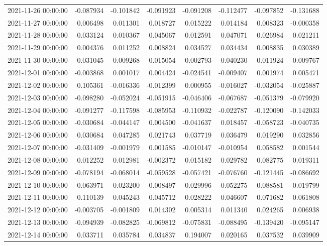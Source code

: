 \begin{tabular}{lrrrrrrr}
2021-11-26 00:00:00 & -0.087934 & -0.101842 & -0.091923 & -0.091208 & -0.112477 & -0.097852 & -0.131688 \\
2021-11-27 00:00:00 & 0.006498 & 0.011301 & 0.018727 & 0.015222 & 0.014184 & 0.008323 & -0.000358 \\
2021-11-28 00:00:00 & 0.033124 & 0.010367 & 0.045067 & 0.012591 & 0.047071 & 0.026984 & 0.021211 \\
2021-11-29 00:00:00 & 0.004376 & 0.011252 & 0.008824 & 0.034527 & 0.034434 & 0.008835 & 0.030389 \\
2021-11-30 00:00:00 & -0.031045 & -0.009268 & -0.015054 & -0.002793 & 0.040230 & 0.011924 & 0.009767 \\
2021-12-01 00:00:00 & -0.003868 & 0.001017 & 0.004424 & -0.024541 & -0.009407 & 0.001974 & 0.005471 \\
2021-12-02 00:00:00 & 0.105361 & -0.016336 & -0.012399 & 0.000955 & -0.016027 & -0.032054 & -0.025887 \\
2021-12-03 00:00:00 & -0.098280 & -0.052024 & -0.051915 & -0.046406 & -0.067687 & -0.051379 & -0.079920 \\
2021-12-04 00:00:00 & -0.091277 & -0.117598 & -0.085953 & -0.110932 & -0.022787 & -0.120090 & -0.142033 \\
2021-12-05 00:00:00 & -0.030684 & -0.044147 & 0.004500 & -0.041637 & 0.018457 & -0.058723 & -0.040735 \\
2021-12-06 00:00:00 & 0.030684 & 0.047285 & 0.021743 & 0.037719 & 0.036479 & 0.019290 & 0.032856 \\
2021-12-07 00:00:00 & -0.031409 & -0.001979 & 0.001585 & -0.010147 & -0.010954 & 0.058582 & 0.001544 \\
2021-12-08 00:00:00 & 0.012252 & 0.012981 & -0.002372 & 0.015182 & 0.029782 & 0.082775 & 0.019311 \\
2021-12-09 00:00:00 & -0.078194 & -0.068014 & -0.059528 & -0.057421 & -0.076760 & -0.121445 & -0.086692 \\
2021-12-10 00:00:00 & -0.063971 & -0.023200 & -0.008497 & -0.029996 & -0.052275 & -0.088581 & -0.019799 \\
2021-12-11 00:00:00 & 0.110139 & 0.045243 & 0.045712 & 0.028222 & 0.046607 & 0.071682 & 0.061808 \\
2021-12-12 00:00:00 & -0.003705 & -0.001809 & 0.014302 & 0.005314 & 0.011340 & 0.024265 & 0.006938 \\
2021-12-13 00:00:00 & -0.094939 & -0.082825 & -0.069812 & -0.075831 & -0.088495 & -0.139420 & -0.095147 \\
2021-12-14 00:00:00 & 0.033711 & 0.035784 & 0.034837 & 0.194007 & 0.020165 & 0.037532 & 0.039909 \\

\end{tabular}
